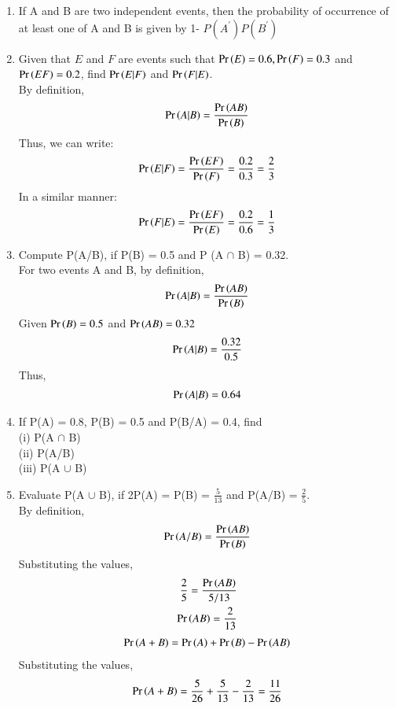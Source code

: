 \begin{enumerate}[label=\thesection.\arabic*.,ref=\thesection.\theenumi]
\item If A and B are two independent events, then the probability of occurrence of at least one of A and B is given by 1- $P(A^{'}) P(B^{'})$\\
\solution

\item Given that $E$ and $F$ are events such that $\Pr\left(E\right) = 0.6, \Pr\left(F\right) = 0.3$ and $\Pr\left(EF\right) = 0.2$, find $\Pr\left(E|F\right)$ and $\Pr\left(F|E\right)$.\\
\solution
By definition, 
\begin{align}
\Pr\left(A|B\right) = \frac{\Pr\left(AB\right)}{\Pr\left(B\right)}
\end{align}
Thus, we can write:
\begin{align}
\Pr\left(E|F\right) = \frac{\Pr\left(EF\right)}{\Pr\left(F\right)} = \frac{0.2}{0.3} = \frac{2}{3}
\end{align}
In a similar manner:
\begin{align}
\Pr\left(F|E\right) = \frac{\Pr\left(EF\right)}{\Pr\left(E\right)} = \frac{0.2}{0.6} = \frac{1}{3}
\end{align}
%
\item Compute P(A/B), if P(B) = 0.5 and P (A $\cap$ B) = 0.32.\\
\solution
For two events A and B, by definition,
\begin{align}
\Pr\left(A|B\right) = \frac{\Pr\left(AB\right)}{\Pr\left(B\right)}
\end{align}
Given $\Pr\left(B\right) = 0.5$ and $\Pr\left(AB\right) = 0.32$
\begin{align}
\Pr\left(A | B\right) = \frac{0.32}{0.5}
\end{align}
Thus,
\begin{align}
\Pr\left(A | B\right) = 0.64
\end{align}

\item If P(A) = 0.8, P(B) = 0.5 and P(B/A) = 0.4, find\\
(i) P(A $\cap$ B)\\
(ii) P(A/B)\\ 
(iii) P(A $\cup$ B)\\
\solution

\item Evaluate P(A $\cup$ B), if 2P(A) = P(B)  = $\frac{5}{13}$ and P(A/B) =  $\frac{2}{5}.$\\
\solution
By definition,
\begin{align}
\Pr\left(A/B\right) = \frac{\Pr\left(AB\right)}{\Pr\left(B\right)}
\end{align}
Substituting the values,
\begin{align}
\frac{2}{5} = \frac{\Pr\left(AB\right)}{5/13}\\
 \Pr\left(AB\right) = \frac{2}{13}
\end{align}
\begin{align}
\Pr\left(A+B\right) = \Pr\left(A\right) + \Pr\left(B\right) - \Pr\left(AB\right)
\end{align}
Substituting the values,
\begin{align}
\Pr\left(A+B\right) = \frac{5}{26} + \frac{5}{13} - \frac{2}{13} = \frac{11}{26}
\end{align}


\end{enumerate}
